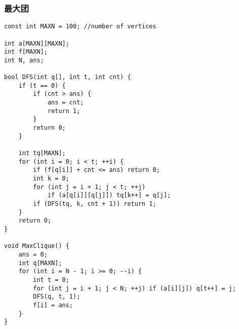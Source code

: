 \subsubsection{最大团}
\begin{verbatim}
const int MAXN = 100; //number of vertices

int a[MAXN][MAXN];
int f[MAXN];
int N, ans;

bool DFS(int q[], int t, int cnt) {
    if (t == 0) {
        if (cnt > ans) {
            ans = cnt;
            return 1;
        }
        return 0;
    }

    int tq[MAXN];
    for (int i = 0; i < t; ++i) {
        if (f[q[i]] + cnt <= ans) return 0;
        int k = 0;
        for (int j = i + 1; j < t; ++j)
            if (a[q[i]][q[j]]) tq[k++] = q[j];
        if (DFS(tq, k, cnt + 1)) return 1;
    }
    return 0;
}

void MaxClique() {
    ans = 0;
    int q[MAXN];
    for (int i = N - 1; i >= 0; --i) {
        int t = 0;
        for (int j = i + 1; j < N; ++j) if (a[i][j]) q[t++] = j;
        DFS(q, t, 1);
        f[i] = ans;
    }
}
\end{verbatim}

